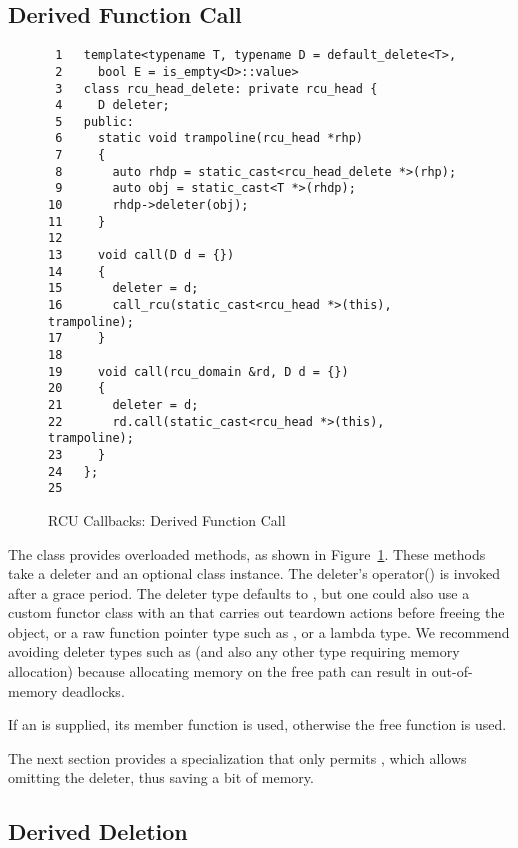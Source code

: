 \documentclass[letterpaper,twocolumn,10pt]{article}
\begin{document}
\subsection{Derived Function Call}
\label{sec:Derived Function Call}

\begin{figure}[tbp]
{ \scriptsize
\begin{verbatim}
 1   template<typename T, typename D = default_delete<T>,
 2     bool E = is_empty<D>::value>
 3   class rcu_head_delete: private rcu_head {
 4     D deleter;
 5   public:
 6     static void trampoline(rcu_head *rhp)
 7     {
 8       auto rhdp = static_cast<rcu_head_delete *>(rhp);
 9       auto obj = static_cast<T *>(rhdp);
10       rhdp->deleter(obj);
11     }
12
13     void call(D d = {})
14     {
15       deleter = d;
16       call_rcu(static_cast<rcu_head *>(this), trampoline);
17     }
18
19     void call(rcu_domain &rd, D d = {})
20     {
21       deleter = d;
22       rd.call(static_cast<rcu_head *>(this), trampoline);
23     }
24   };
25
\end{verbatim}
}
\caption{RCU Callbacks: Derived Function Call}
\label{fig:RCU Callbacks: Derived Function Call}
\end{figure}

The  class provides overloaded  methods,
as shown in
Figure~\ref{fig:RCU Callbacks: Derived Function Call}.
These methods take a deleter and an optional
 class instance.
The deleter's operator() is invoked after a grace period.
The deleter type defaults to ,
but one could also use a
custom functor class with an  that carries out teardown actions
before freeing the object, or a raw function pointer type such as
, or a lambda type.
We recommend avoiding deleter types such as 
(and also any other type requiring memory allocation) because
allocating memory on the free path can result in out-of-memory deadlocks.

If an  is supplied, its 
member function is used, otherwise the  free
function is used.

The next section provides a specialization that only permits ,
which allows omitting the deleter, thus saving a bit of memory.

\subsection{Derived Deletion}
\label{sec:Derived Deletion}
\end{document}
